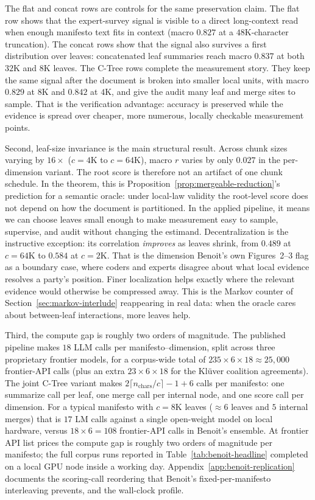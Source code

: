 The flat and concat rows are controls for the same preservation claim.
The flat row shows that the expert-survey signal is visible to a direct
long-context read when enough manifesto text fits in context (macro
$0.827$ at a $48\mathrm{K}$-character truncation). The concat rows show
that the signal also survives a first distribution over leaves:
concatenated leaf summaries reach macro $0.837$ at both $32\mathrm{K}$
and $8\mathrm{K}$ leaves. The C-Tree rows complete the measurement
story. They keep the same signal after the document is broken into
smaller local units, with macro $0.829$ at $8\mathrm{K}$ and $0.842$ at
$4\mathrm{K}$, and give the audit many leaf and merge sites to sample.
That is the verification advantage: accuracy is preserved while the
evidence is spread over cheaper, more numerous, locally checkable
measurement points.

Second, leaf-size invariance is the main structural result. Across chunk
sizes varying by $16\times$ ($c = 4\mathrm{K}$ to $c = 64\mathrm{K}$),
macro $r$ varies by only $0.027$ in the per-dimension variant. The root
score is therefore not an artifact of one chunk schedule. In the theorem,
this is Proposition~\ref{prop:mergeable-reduction}'s prediction for a
semantic oracle: under local-law validity the root-level score does not
depend on how the document is partitioned. In the applied pipeline, it
means we can choose leaves small enough to make measurement easy to
sample, supervise, and audit without changing the estimand. Decentralization
is the instructive exception: its correlation \emph{improves} as leaves
shrink, from $0.489$ at $c = 64\mathrm{K}$ to $0.584$ at
$c = 2\mathrm{K}$. That is the dimension Benoit's own Figures~2--3 flag
as a boundary case, where coders and experts disagree about what local
evidence resolves a party's position. Finer localization helps exactly
where the relevant evidence would otherwise be compressed away. This is
the Markov counter of Section~\ref{sec:markov-interlude} reappearing in
real data: when the oracle cares about between-leaf interactions, more
leaves help.

Third, the compute gap is roughly two orders of magnitude. The published \citet{BenoitEtAl2025} pipeline makes $18$ LLM calls per
manifesto--dimension, split across three proprietary frontier models,
for a corpus-wide total of $235 \times 6 \times 18 \approx 25{,}000$
frontier-API calls (plus an extra $23 \times 6 \times 18$ for the
Kl\"uver coalition agreements). The joint C-Tree variant makes
$2\lceil n_{\text{chars}}/c\rceil - 1 + 6$ calls per manifesto: one
summarize call per leaf, one merge call per internal node, and one
score call per dimension. For a typical manifesto with $c = 8\mathrm{K}$
leaves ($\approx 6$ leaves and $5$ internal merges) that is $17$ LM
calls against a single open-weight model on local hardware, versus
$18 \times 6 = 108$ frontier-API calls in Benoit's ensemble. At frontier
API list prices the compute gap is roughly two orders of magnitude per
manifesto; the full corpus runs reported in
Table~\ref{tab:benoit-headline} completed on a local GPU node inside a
working day. Appendix~\ref{app:benoit-replication} documents the
scoring-call reordering that Benoit's fixed-per-manifesto interleaving
prevents, and the wall-clock profile.

